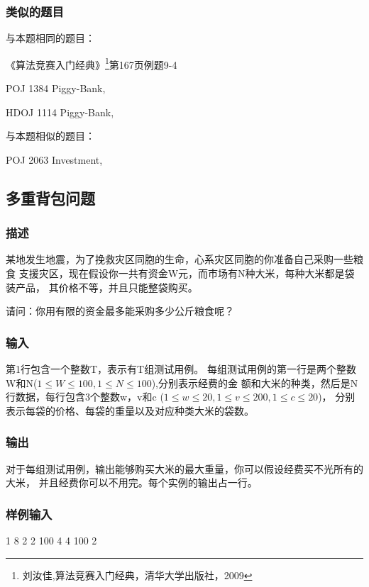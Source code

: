 \subsubsection{类似的题目}
与本题相同的题目：
\begindot
\item 《算法竞赛入门经典》\footnote{刘汝佳,算法竞赛入门经典，清华大学出版社，2009}第167页例题9-4
\item POJ 1384 Piggy-Bank, 
\item HDOJ 1114 Piggy-Bank, 
\myenddot

与本题相似的题目：
\begindot
\item POJ 2063 Investment, 
\myenddot

\subsection{多重背包问题}

\subsubsection{描述}
某地发生地震，为了挽救灾区同胞的生命，心系灾区同胞的你准备自己采购一些粮食
支援灾区，现在假设你一共有资金W元，而市场有N种大米，每种大米都是袋装产品，
其价格不等，并且只能整袋购买。

请问：你用有限的资金最多能采购多少公斤粮食呢？

\subsubsection{输入}
第1行包含一个整数T，表示有T组测试用例。
每组测试用例的第一行是两个整数W和N($1 \leq W \leq 100, 1 \leq N \leq 100$),分别表示经费的金
额和大米的种类，然后是N行数据，每行包含3个整数w，v和c
($1 \leq w \leq 20,1 \leq v \leq 200,1 \leq c \leq 20$)，
分别表示每袋的价格、每袋的重量以及对应种类大米的袋数。

\subsubsection{输出}
对于每组测试用例，输出能够购买大米的最大重量，你可以假设经费买不光所有的大米，
并且经费你可以不用完。每个实例的输出占一行。

\subsubsection{样例输入}
\begin{Code}
1
8 2
2 100 4
4 100 2
\end{Code}

